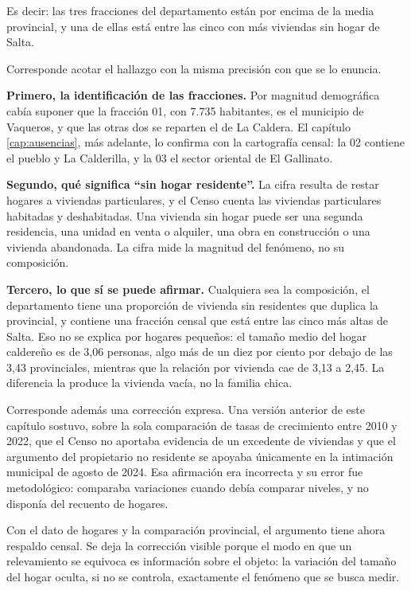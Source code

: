 Es decir: las tres fracciones del departamento están por encima de la media provincial, y una de ellas está entre las cinco con más viviendas sin hogar de Salta.

\begin{cautela}
Corresponde acotar el hallazgo con la misma precisión con que se lo enuncia.

\textbf{Primero, la identificación de las fracciones.} Por magnitud demográfica cabía suponer que la fracción 01, con 7.735 habitantes, es el municipio de Vaqueros, y que las otras dos se reparten el de La Caldera. El capítulo \ref{cap:ausencias}, más adelante, lo confirma con la cartografía censal: la 02 contiene el pueblo y La Calderilla, y la 03 el sector oriental de El Gallinato.

\textbf{Segundo, qué significa ``sin hogar residente''.} La cifra resulta de restar hogares a viviendas particulares, y el Censo cuenta las viviendas particulares habitadas y deshabitadas. Una vivienda sin hogar puede ser una segunda residencia, una unidad en venta o alquiler, una obra en construcción o una vivienda abandonada. La cifra mide la magnitud del fenómeno, no su composición.

\textbf{Tercero, lo que sí se puede afirmar.} Cualquiera sea la composición, el departamento tiene una proporción de vivienda sin residentes que duplica la provincial, y contiene una fracción censal que está entre las cinco más altas de Salta. Eso no se explica por hogares pequeños: el tamaño medio del hogar caldereño es de 3,06 personas, algo más de un diez por ciento por debajo de las 3,43 provinciales, mientras que la relación por vivienda cae de 3,13 a 2,45. La diferencia la produce la vivienda vacía, no la familia chica.
\end{cautela}

Corresponde además una corrección expresa. Una versión anterior de este capítulo sostuvo, sobre la sola comparación de tasas de crecimiento entre 2010 y 2022, que el Censo no aportaba evidencia de un excedente de viviendas y que el argumento del propietario no residente se apoyaba únicamente en la intimación municipal de agosto de 2024. Esa afirmación era incorrecta y su error fue metodológico: comparaba variaciones cuando debía comparar niveles, y no disponía del recuento de hogares.

Con el dato de hogares y la comparación provincial, el argumento tiene ahora respaldo censal. Se deja la corrección visible porque el modo en que un relevamiento se equivoca es información sobre el objeto: la variación del tamaño del hogar oculta, si no se controla, exactamente el fenómeno que se busca medir.

